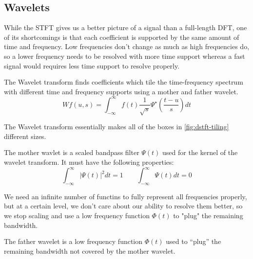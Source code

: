 \subsection{Wavelets}
While the STFT gives us a better picture of a signal than a full-length DFT, one of its shortcomings is that each coefficient is supported by the same amount of time and frequency. 
Low frequencies don't change as much as high frequencies do, so a lower frequency needs to be resolved with more time support whereas a fast signal would requires less time support to resolve properly.
\begin{definition}
  The Wavelet transform finds coefficients which tile the time-frequency spectrum with different time and frequency supports using a mother and father wavelet.
  \[
	Wf(u, s) = \int_{-\infty}^{\infty}f(t)\frac{1}{\sqrt{s}}\Psi^\star\left(\frac{t-u}{s}\right)dt
  \]
  \label{defn:wavelet-transform}
\end{definition}
The Wavelet transform essentially makes all of the boxes in \cref{fig:dstft-tiling} different sizes.
\begin{definition}
  The mother wavlet is a scaled bandpass filter $\Psi(t)$ used for the kernel of the wavelet transform. It must have the following properties:
  \[
	\int_{-\infty}^{\infty}|\Psi(t)|^2dt=1 \qquad \int_{-\infty}^{\infty}\Psi(t)dt = 0
  \]
  \label{defn:mother-wavelet}
\end{definition}
We need an infinite number of functins to fully represent all frequencies properly, but at a certain level, we don't care about our ability to resolve them better, so we stop scaling and use a low frequency function $\Phi(t)$ to "plug" the remaining bandwidth. 
\begin{definition}
  The father wavelet is a low frequency function $\Phi(t)$ used to ``plug'' the remaining bandwidth not covered by the mother wavelet.
  \label{defn:father-wavelet}
\end{definition}
